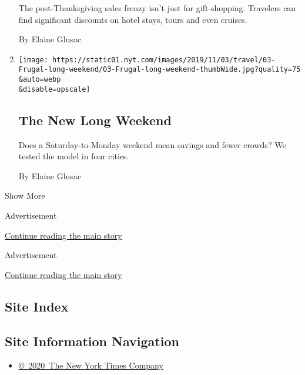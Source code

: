 \begin{enumerate}
  The post-Thanksgiving sales frenzy isn't just for gift-shopping.
  Travelers can find significant discounts on hotel stays, tours and
  even cruises.

  By Elaine Glusac
\item
  \href{/2019/11/01/travel/weekend-trips.html}{}

  \texttt{[image: https://static01.nyt.com/images/2019/11/03/travel/03-Frugal-long-weekend/03-Frugal-long-weekend-thumbWide.jpg?quality=75\\\&auto=webp\\\&disable=upscale]}

  \hypertarget{the-new-long-weekend}{%
  \subsection{The New Long Weekend}\label{the-new-long-weekend}}

  Does a Saturday-to-Monday weekend mean savings and fewer crowds? We
  tested the model in four cities.

  By Elaine Glusac
\end{enumerate}

Show More

Advertisement

\protect\hyperlink{after-mid1}{Continue reading the main story}

Advertisement

\protect\hyperlink{after-mktg}{Continue reading the main story}

\hypertarget{site-index}{%
\subsection{Site Index}\label{site-index}}

\hypertarget{site-information-navigation}{%
\subsection{Site Information
Navigation}\label{site-information-navigation}}

\begin{itemize}
\tightlist
\item
  \href{https://help.nytimes.com/hc/en-us/articles/115014792127-Copyright-notice}{©~2020~The
  New York Times Company}
\end{itemize}

